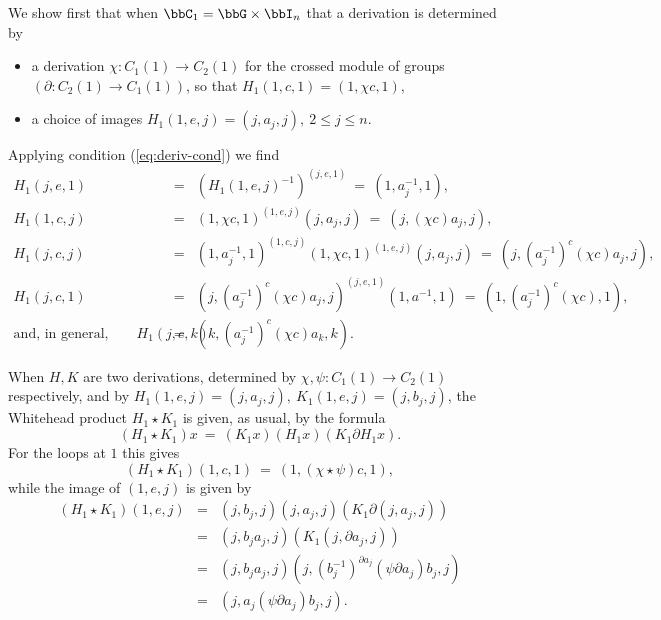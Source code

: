 \medskip
We show first that when $\bbC_1 = \bbG \times \bbI_n$ that a derivation 
is determined by 
\begin{itemize}
\item
a derivation $\chi : C_1(1) \to C_2(1)$ 
for the crossed module of groups $(\partial : C_2(1) \to C_1(1))$, 
so that $H_1(1,c,1) = (1,\chi c,1)$, 
\item
a choice of images $H_1(1,e,j) = (j,a_j,j),~ 2 \leqslant j \leqslant n$. 
\end{itemize}
Applying condition (\ref{eq:deriv-cond}) we find 
\begin{eqnarray*}
H_1(j,e,1) &=& (H_1(1,e,j)^{-1})^{(j,e,1)} 
               ~=~ (1,a_j^{-1},1), \\
H_1(1,c,j) &=& (1,\chi c,1)^{(1,e,j)}(j,a_j,j) 
               ~=~ (j,(\chi c)a_j,j), \\
H_1(j,c,j) &=& (1,a_j^{-1},1)^{(1,c,j)}(1,\chi c,1)^{(1,e,j)}(j,a_j,j) 
               ~=~ (j,(a_j^{-1})^c(\chi c)a_j,j), \\
H_1(j,c,1) &=& (j,(a_j^{-1})^c(\chi c)a_j,j)^{(j,e,1)}(1,a^{-1},1) 
               ~=~ (1,(a_j^{-1})^c(\chi c),1), \\
\text{and, in general,}\qquad
H_1(j,c,k) &=& (k,(a_j^{-1})^c(\chi c)a_k,k). 
\end{eqnarray*}

\noindent 
When $H,K$ are two derivations, 
determined by $\chi,\psi : C_1(1) \to C_2(1)$ respectively, 
and by $H_1(1,e,j) = (j,a_j,j),~ K_1(1,e,j) = (j,b_j,j)$, 
the Whitehead product $H_1 \star K_1$ is given, as usual, by the formula 
$$
(H_1 \star K_1)x ~=~ (K_1 x)(H_1 x)(K_1 \partial H_1 x). 
$$
For the loops at $1$ this gives 
$$
(H_1 \star K_1)(1,c,1) ~=~ (1, (\chi\star\psi)c, 1),  
$$
while the image of $(1,e,j)$ is given by 
\begin{eqnarray*}
(H_1 \star K_1)(1,e,j) 
  &=&  (j,b_j,j)(j,a_j,j)(K_1\partial(j,a_j,j)) \\
  &=&  (j,b_ja_j,j)(K_1(j,\partial a_j,j)) \\
  &=&  (j,b_ja_j,j)(j,(b_j^{-1})^{\partial a_j}(\psi\partial a_j)b_j,j) \\
  &=&  (j,a_j(\psi\partial a_j)b_j,j).
\end{eqnarray*}

